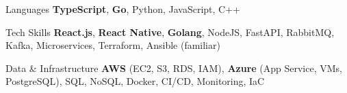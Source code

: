 
\begin{cvskills}

  \cvskill
  {Languages}
  {\textbf{TypeScript}, \textbf{Go}, Python, JavaScript, C++}

  \cvskill
  {Tech Skills}
  {\textbf{React.js}, \textbf{React Native}, \textbf{Golang}, NodeJS, FastAPI, RabbitMQ, Kafka, Microservices, Terraform, Ansible (familiar)}

  \cvskill
  {Data \& Infrastructure}
  {\textbf{AWS} (EC2, S3, RDS, IAM), \textbf{Azure} (App Service, VMs, PostgreSQL), SQL, NoSQL, Docker, CI/CD, Monitoring, IaC}

\end{cvskills}
